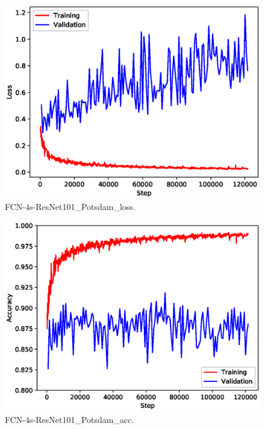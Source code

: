 \documentclass[conference]{IEEEtran}
\begin{document}
\begin{center}
	\begin{figure}
		\begin{center}
			\includegraphics[scale=0.75]{image/FCN-4s-ResNet101_Potsdam_loss}
		\end{center}
		\caption{FCN-4s-ResNet101\_Potsdam\_loss.}
		\label{residualblock}
	\end{figure}
\end{center}

\begin{center}
	\begin{figure}
		\begin{center}
			\includegraphics[scale=0.75]{image/FCN-4s-ResNet101_Potsdam_acc}
		\end{center}
		\caption{FCN-4s-ResNet101\_Potsdam\_acc.}
		\label{residualblock}
	\end{figure}
\end{center}
\end{document}
